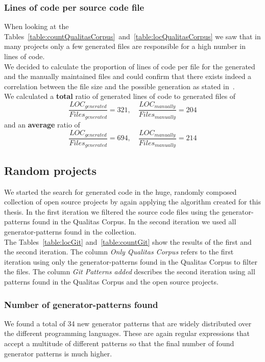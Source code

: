 \subsubsection{Lines of code per source code file}
When looking at the Tables~\ref{table:countQualitasCorpus}~and~\ref{table:locQualitasCorpus} we saw that in many projects only a few generated files are responsible for a high number in lines of code.\\
We decided to calculate the proportion of lines of code per file for the generated and the manually maintained files and could confirm that there exists indeed a correlation between the file size and the possible generation as stated in~\cite{Bernwieser2014}.\\
We calculated a \textbf{total} ratio of generated lines of code to generated files of 
\begin{equation}
	\frac{LOC_{generated}}{Files_{generated}} = 321 , \quad \frac{LOC_{manually}}{Files_{manually}} = 204
\end{equation}
and an \textbf{average} ratio of
\begin{equation}
	\frac{LOC_{generated}}{Files_{generated}} = 694 , \quad \frac{LOC_{manually}}{Files_{manually}} = 214
\end{equation}




\cleardoublepage{}
\subsection{Random projects}
We started the search for generated code in the huge, randomly composed collection of open source projects by again applying the algorithm created for this thesis. In the first iteration we filtered the source code files using the generator-patterns found in the Qualitas Corpus. In the second iteration we used all generator-patterns found in the collection. \\
The Tables~\ref{table:locGit} and~\ref{table:countGit} show the results of the first and the second iteration. The column \textit{Only Qualitas Corpus} refers to the first iteration using only the generator-patterns found in the Qualitas Corpus to filter the files. The column \textit{Git Patterns added} describes the second iteration using all patterns found in the Qualitas Corpus and the open source projects.

\subsubsection{Number of generator-patterns found}
We found a total of 34 new generator patterns that are widely distributed over the different programming languages. These are again regular expressions that accept a multitude of different patterns so that the final number of found generator patterns is much higher.

